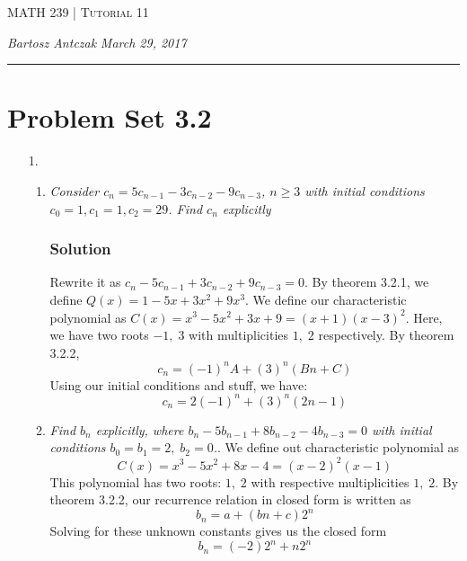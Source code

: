 \documentclass[10pt]{report}
\newcommand{\lectureNum}{11}
\newcommand{\curDate}{March 29, 2017}
\newcommand{\course}{MATH 239}
\begin{document}
\begin{center}
\begin{Large}
\textsc{\course{} | Tutorial \lectureNum{}}
\end{Large}
\end{center} 
\noindent \textit{Bartosz Antczak} \hfill
\textit{\curDate{}}
\rule{\textwidth}{0.4pt}
\section*{Problem Set 3.2}
\begin{enumerate}
\item[1.]
\begin{enumerate}
\item \textit{Consider $c_n = 5c_{n-1}-3c_{n-2}-9c_{n-3}$, $n \geq 3$ with initial conditions $c_0=1, c_1=1, c_2 = 29$. Find $c_n$ explicitly}
\subsubsection{Solution}
Rewrite it as $c_n - 5c_{n-1}+3c_{n-2}+9c_{n-3} = 0$. By theorem 3.2.1, we define $Q(x) = 1-5x+3x^2+9x^3$. We define our characteristic polynomial as $C(x) = x^3 - 5x^2 + 3x + 9 = (x+1)(x-3)^2$. Here, we have two roots $-1,\;3$ with multiplicities $1, \; 2$ respectively. By theorem 3.2.2,
$$c_n = (-1)^nA + (3)^n(Bn+C)$$
Using our initial conditions and stuff, we have:
$$c_n = 2(-1)^n + (3)^n(2n-1)$$
\item \textit{Find $b_n$ explicitly, where $b_n-5b_{n-1}+8b_{n-2}-4b_{n-3} = 0$ with initial conditions $b_0 = b_1 = 2, \; b_2 = 0$.}. We define out characteristic polynomial as
$$C(x) = x^3 - 5x^2 + 8x - 4 = (x-2)^2(x-1)$$
This polynomial has two roots: $1,\; 2$ with respective multiplicities $1,\; 2$. By theorem 3.2.2, our recurrence relation in closed form is written as
$$b_n = a + (bn + c)2^n$$
Solving for these unknown constants gives us the closed form
$$b_n = (-2)2^n  + n2^n$$
\end{enumerate} 
\end{enumerate}
\end{document}
